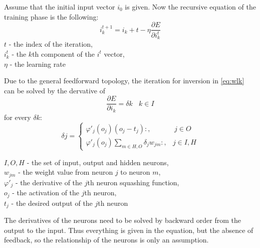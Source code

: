 Assume that the initial input vector $i_0$ is given. Now the recursive equation of the training phase is the following: 
\begin{equation} i_k^{t+1} = i_k+t - \eta \frac{\partial E}{\partial i_k^t} \label{eq:wlk} \end{equation} 
$t$ - the index of the iteration, \\
$i_k^t$ - the $k$th component of the $i^t$ vector, \\
$\eta$ - the learning rate \bigskip

Due to the general feedforward topology, the iteration for inversion in \eqref{eq:wlk} can be solved by the dervative of 
$$ \frac{\partial E}{\partial i_k} = \delta k ~~~~ k \in I$$
for every $\delta k$:
$$ \delta j = \begin{cases} \varphi'_j(o_j)(o_j-t_j):, & ~ j \in O \\ 
\varphi'_j(o_j)\sum_{m\in H,O}\delta_j w_{jm}:, & j \in I, H \end{cases} $$

\noindent $I, O, H$ - the set of input, output and hidden neurons,\\
$w_{jm}$ - the weight value from neuron $j$ to neuron $m$,\\
$\varphi'_j$ - the derivative of the $j$th neuron squashing function,\\
$o_j$ - the activation of the $j$th neuron,\\
$t_j$ - the desired output of the $j$th neuron \bigskip

The derivatives of the neurons need to be solved by backward order from the output to the input. Thus everything is given in the equation, but the absence of feedback, so the relationship of the neurons is only an assumption.

